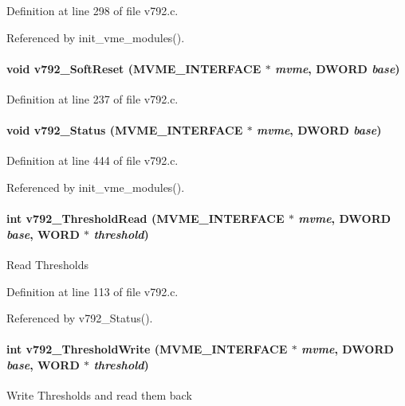 Definition at line 298 of file v792.c.

Referenced by init\_\-vme\_\-modules().
\paragraph[{v792\_\-SoftReset}]{\setlength{\rightskip}{0pt plus 5cm}void v792\_\-SoftReset ({\bf MVME\_\-INTERFACE} $\ast$ {\em mvme}, \/  {\bf DWORD} {\em base})}\hfill\label{v792_8c_aff0ebd895470a6d2708042eb48eb314b}


Definition at line 237 of file v792.c.
\paragraph[{v792\_\-Status}]{\setlength{\rightskip}{0pt plus 5cm}void v792\_\-Status ({\bf MVME\_\-INTERFACE} $\ast$ {\em mvme}, \/  {\bf DWORD} {\em base})}\hfill\label{v792_8c_a3df455258c8d38e5c7959b0e16c64583}


Definition at line 444 of file v792.c.

Referenced by init\_\-vme\_\-modules().
\paragraph[{v792\_\-ThresholdRead}]{\setlength{\rightskip}{0pt plus 5cm}int v792\_\-ThresholdRead ({\bf MVME\_\-INTERFACE} $\ast$ {\em mvme}, \/  {\bf DWORD} {\em base}, \/  {\bf WORD} $\ast$ {\em threshold})}\hfill\label{v792_8c_a6410a5e010a043f3c1f0ccac13e89ec4}
Read Thresholds 

Definition at line 113 of file v792.c.

Referenced by v792\_\-Status().
\paragraph[{v792\_\-ThresholdWrite}]{\setlength{\rightskip}{0pt plus 5cm}int v792\_\-ThresholdWrite ({\bf MVME\_\-INTERFACE} $\ast$ {\em mvme}, \/  {\bf DWORD} {\em base}, \/  {\bf WORD} $\ast$ {\em threshold})}\hfill\label{v792_8c_a3eec625d3dca654c6f99f82d964d4287}
Write Thresholds and read them back 

